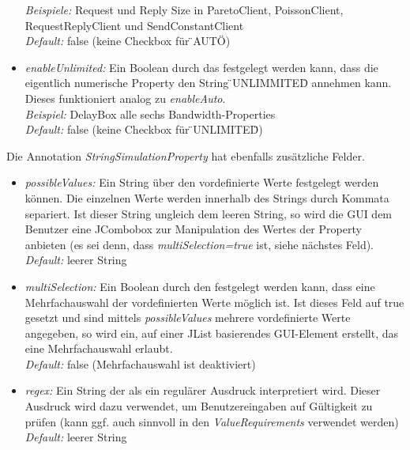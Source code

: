 \documentclass[a4paper, 11pt]{article} %
\begin{document}
\begin{itemize}
	\emph{Beispiele:} Request und Reply Size in ParetoClient, PoissonClient, RequestReplyClient und SendConstantClient\\
	\emph{Default:} false (keine Checkbox für \"{}AUTO\"{}) 
	\item \emph{enableUnlimited:} Ein Boolean durch das festgelegt werden kann, dass die eigentlich numerische Property den String \"{}UNLIMMITED\"{} annehmen kann. Dieses funktioniert analog zu \emph{enableAuto}.\\
	\emph{Beispiel:} DelayBox alle sechs Bandwidth-Properties\\
	\emph{Default:} false (keine Checkbox für \"{}UNLIMITED\"{})
\end{itemize}

Die Annotation \emph{StringSimulationProperty} hat ebenfalls zusätzliche Felder.
\begin{itemize}
	\item \emph{possibleValues:} Ein String über den vordefinierte Werte festgelegt werden können. Die einzelnen Werte werden innerhalb des Strings durch Kommata separiert. Ist dieser String ungleich dem leeren String, so wird die GUI dem Benutzer eine JCombobox zur Manipulation des Wertes der Property anbieten (es sei denn, dass \emph{multiSelection=true} ist, siehe nächstes Feld).\\
	\emph{Default:} leerer String
	\item \emph{multiSelection:} Ein Boolean durch den festgelegt werden kann, dass eine Mehrfachauswahl der vordefinierten Werte möglich ist. Ist dieses Feld auf true gesetzt und sind mittels \emph{possibleValues} mehrere vordefinierte Werte angegeben, so wird ein, auf einer JList basierendes GUI-Element erstellt, das eine Mehrfachauswahl erlaubt.\\
	\emph{Default:} false (Mehrfachauswahl ist deaktiviert) 
	\item \emph{regex:} Ein String der als ein regulärer Ausdruck interpretiert wird. Dieser Ausdruck wird dazu verwendet, um Benutzereingaben auf Gültigkeit zu prüfen (kann ggf. auch sinnvoll in den \emph{ValueRequirements} verwendet werden)\\
	\emph{Default:} leerer String
\end{itemize}

\end{document}
